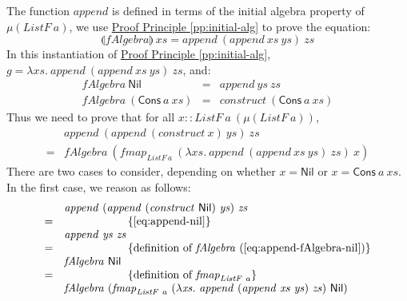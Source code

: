 \documentclass{jfp1}
\newcommand{\fold}[1]{\llparenthesis #1 \rrparenthesis}
\newcommand{\eqAnnotation}[1]{\hspace{2cm}\left\{\textrm{#1}\right\}}
\newcommand{\proofprinref}[1]{\hyperref[#1]{Proof Principle \ref*{#1}}}
\begin{document}
\begin{proof*}
  The function $\mathit{append}$ is defined in terms of the initial
  algebra property of $\mu(\mathit{ListF}~a)$, we use
  \proofprinref{pp:initial-alg} to prove the equation:
  \begin{displaymath}
    \fold{\mathit{fAlgebra}}~\mathit{xs} = \mathit{append}~(\mathit{append}~\mathit{xs}~\mathit{ys})~\mathit{zs}
  \end{displaymath}
  In this instantiation of \proofprinref{pp:initial-alg}, $g = \lambda
  \mathit{xs}.~\mathit{append}~(\mathit{append}~\mathit{xs}~\mathit{ys})~\mathit{zs}$,
  and:
  \begin{eqnarray}
    \label{eq:append-fAlgebra-nil}
    \mathit{fAlgebra}~\mathsf{Nil} &=& \mathit{append}~\mathit{ys}~\mathit{zs} \\
    \label{eq:append-fAlgebra-cons}
    \mathit{fAlgebra}~(\mathsf{Cons}~a~\mathit{xs}) &=& \mathit{construct}~(\mathsf{Cons}~a~\mathit{xs})
  \end{eqnarray}
  Thus we need to prove that for all $x ::
  \mathit{ListF}~a~(\mu(\mathit{ListF}~a))$,
  \begin{displaymath}
    \begin{array}{cl}
      &\mathit{append}~(\mathit{append}~(\mathit{construct}~x)~\mathit{ys})~\mathit{zs}\\
      =&\mathit{fAlgebra}~(\mathit{fmap}_{\mathit{ListF}~a}~(\lambda \mathit{xs}.~\mathit{append}~(\mathit{append}~\mathit{xs}~\mathit{ys})~\mathit{zs})~x)
    \end{array}
  \end{displaymath}
  There are two cases to consider, depending on whether $x =
  \mathsf{Nil}$ or $x = \mathsf{Cons}~a~\mathit{xs}$. In the first
  case, we reason as follows:
  \begin{displaymath}
    \begin{array}{cl}
      & \mathit{append}~(\mathit{append}~(\mathit{construct}~\mathsf{Nil})~\mathit{ys})~\mathit{zs}\\
      =&\eqAnnotation{\autoref{eq:append-nil}} \\
      & \mathit{append}~\mathit{ys}~\mathit{zs} \\
      =&\eqAnnotation{definition of $\mathit{fAlgebra}$ (\autoref{eq:append-fAlgebra-nil})} \\
      & \mathit{fAlgebra}~\mathsf{Nil} \\
      =&\eqAnnotation{definition of $\mathit{fmap}_{\mathit{ListF}~a}$} \\
      & \mathit{fAlgebra}~(\mathit{fmap}_{\mathit{ListF}~a}~(\lambda \mathit{xs}.~\mathit{append}~(\mathit{append}~\mathit{xs}~\mathit{ys})~\mathit{zs})~\mathsf{Nil})

\end{array}
\end{displaymath}
\end{proof*}
\end{document}
